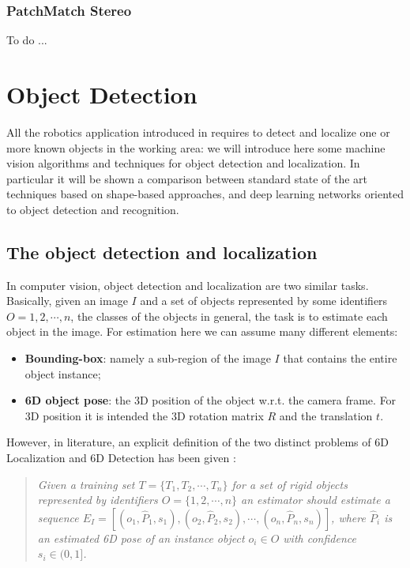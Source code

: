 \subsubsection{PatchMatch Stereo}\label{subsubsec:patchmatchstereo}
To do ...

\section{Object Detection}\label{sec:objectdetection}
All the robotics application introduced in  requires to detect and localize one or more known objects in the working area: we will introduce here some machine vision algorithms and techniques for object detection and localization. In particular it will be shown a comparison between standard state of the art techniques based on shape-based approaches, and deep learning networks oriented to object detection and recognition.

\subsection{The object detection and localization}\label{subsec:detection_and_localization}
In computer vision, object detection and localization are two similar tasks. Basically, given an image $I$ and a set of objects represented by some identifiers $O = {1, 2, \cdots, n}$, the classes of the objects in general, the task is to estimate each object in the image. For estimation here we can assume many different elements:

\begin{itemize}
	\item \textbf{Bounding-box}: namely a sub-region of the image $I$ that contains the entire object instance;
	\item \textbf{6D object pose}: the 3D position of the object w.r.t. the camera frame. For 3D position it is intended the 3D rotation matrix $R$ and the translation $t$.
\end{itemize}

However, in literature, an explicit definition of the two distinct problems of 6D Localization and 6D Detection has been given \cite{hodan20166DPoseEstimation}:

\begin{quotation}
\emph{Given a training set $T = \{T_1 , T_2 , \cdots , T_n \}$ for a set of rigid objects represented by identifiers $O = \{1, 2, \cdots , n\}$ an estimator should estimate a sequence $E_I = [(o_1, \hat{P}_1, s_1), (o_2, \hat{P}_2, s_2), \cdots , (o_n, \hat{P}_n, s_n)]$, where $\hat{P}_i$ is an estimated 6D pose of an instance object $o_i \in O$ with confidence $s_i \in (0, 1]$.}
\end{quotation}

